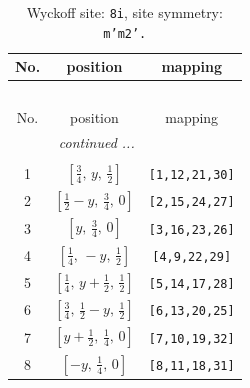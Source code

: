 \documentclass[fleqn,8pt]{jsarticle}
\begin{document}
\begin{longtable}{ccc}
\caption{Wyckoff site: {\tt 8i}, site symmetry: {\tt m'm2'.}}
 \\
 \hline \hline
No. & position & mapping \\ \hline \endfirsthead

\multicolumn{2}{l}{\tablename\ \thetable{}} \\
 \hline \hline
No. & position & mapping \\ \hline \endhead

 \hline \hline
\multicolumn{2}{r}{\footnotesize\it continued ...} \\ \endfoot

 \hline \hline
\multicolumn{2}{r}{} \\ \endlastfoot

1 & $\left[ \frac{3}{4},\, y,\, \frac{1}{2} \right]$ & {\tt [1,12,21,30]} \\ \hline
2 & $\left[ \frac{1}{2} - y,\, \frac{3}{4},\, 0 \right]$ & {\tt [2,15,24,27]} \\ \hline
3 & $\left[ y,\, \frac{3}{4},\, 0 \right]$ & {\tt [3,16,23,26]} \\ \hline
4 & $\left[ \frac{1}{4},\, - y,\, \frac{1}{2} \right]$ & {\tt [4,9,22,29]} \\ \hline
5 & $\left[ \frac{1}{4},\, y + \frac{1}{2},\, \frac{1}{2} \right]$ & {\tt [5,14,17,28]} \\ \hline
6 & $\left[ \frac{3}{4},\, \frac{1}{2} - y,\, \frac{1}{2} \right]$ & {\tt [6,13,20,25]} \\ \hline
7 & $\left[ y + \frac{1}{2},\, \frac{1}{4},\, 0 \right]$ & {\tt [7,10,19,32]} \\ \hline
8 & $\left[ - y,\, \frac{1}{4},\, 0 \right]$ & {\tt [8,11,18,31]} \\
\end{longtable}
\renewcommand{\arraystretch}{1.2}
\end{document}
